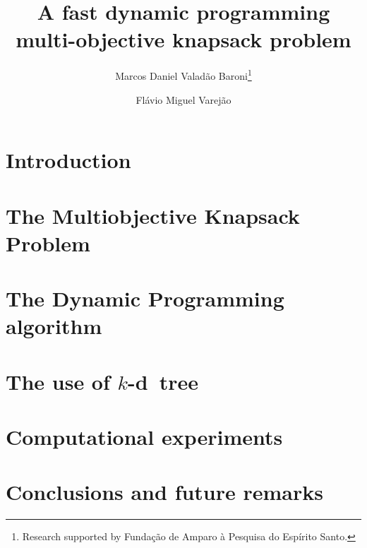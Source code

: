\documentclass{article}
\newcommand{\kdtree}{$k$-d~tree}
\begin{document}
\title{A fast dynamic programming multi-objective knapsack problem}

\author{
   Marcos Daniel Valad\~ao Baroni\thanks{Research supported by Funda\c c\~ao de Amparo \`a Pesquisa do Esp\'irito Santo.}
   \and
   Fl\'avio Miguel Varej\~ao
}





\maketitle

\begin{abstract}

\end{abstract}

\section{Introduction}
\label{sec:intro}


\section{The Multiobjective Knapsack Problem}
\label{sec:mokp}


\section{The Dynamic Programming algorithm}
\label{sec:progdyn}


\section{The use of \kdtree{}}
\label{sec:kdtree}


\section{Computational experiments}
\label{sec:exp}


\section{Conclusions and future remarks}
\label{sec:conc}




\end{document}
